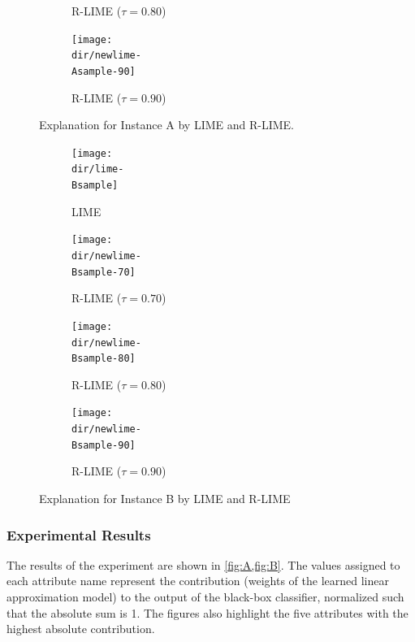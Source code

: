 \documentclass[runningheads]{llncs}
\begin{document}
{\begin{figure}[p]
\begin{subfigure}[t]{\imgwidth}
        \caption{R-LIME ($\tau=0.80$)}\label{fig:A-rlime-80}
      \end{subfigure}
      \begin{subfigure}[t]{\imgwidth}
        \texttt{[image: \\dir/newlime-\\Asample-90]}
        \caption{R-LIME ($\tau=0.90$)}\label{fig:A-rlime-90}
      \end{subfigure}
      \caption{Explanation for Instance A by LIME and R-LIME.}\label{fig:A}
    \end{figure}
    \begin{figure}[p]
      \def\scale{0.3}
      \def\imgwidth{0.5\textwidth}
      \begin{subfigure}[t]{\imgwidth}
        \texttt{[image: \\dir/lime-\\Bsample]}
        \caption{LIME}\label{fig:B-lime}
      \end{subfigure}
      \begin{subfigure}[t]{\imgwidth}
        \texttt{[image: \\dir/newlime-\\Bsample-70]}
        \caption{R-LIME ($\tau=0.70$)}\label{fig:B-rlime-70}
      \end{subfigure}
      \begin{subfigure}[t]{\imgwidth}
        \texttt{[image: \\dir/newlime-\\Bsample-80]}
        \caption{R-LIME ($\tau=0.80$)}\label{fig:B-rlime-80}
      \end{subfigure}
      \begin{subfigure}[t]{\imgwidth}
        \texttt{[image: \\dir/newlime-\\Bsample-90]}
        \caption{R-LIME ($\tau=0.90$)}\label{fig:B-rlime-90}
      \end{subfigure}
      \caption{Explanation for Instance B by LIME and R-LIME}\label{fig:B}
    \end{figure}
  }
\subsubsection{Experimental Results}
The results of the experiment are shown in \cref{fig:A,fig:B}.
The values assigned to each attribute name represent the contribution (weights of the learned linear approximation model) to the output of the black-box classifier, normalized such that the absolute sum is 1.
The figures also highlight the five attributes with the highest absolute contribution.
\end{document}
